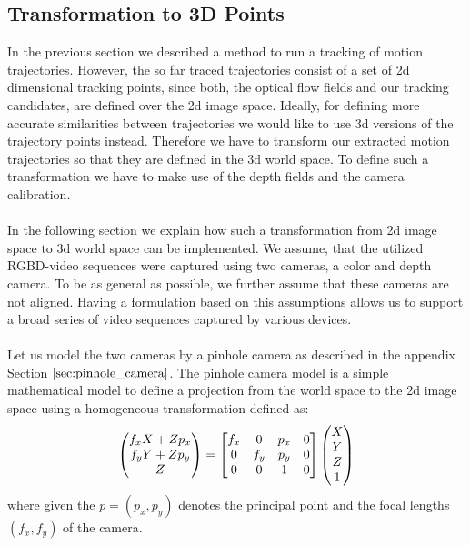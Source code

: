 \subsection{Transformation to 3D Points}
\label{subsection:transform_to_3d_points}
In the previous section we described a method to run a tracking of motion trajectories. However, the so far traced trajectories consist of a set of 2d dimensional tracking points, since both, the optical flow fields and our tracking candidates, are defined over the 2d image space. Ideally, for defining more accurate similarities between trajectories we would like to use 3d versions of the trajectory points instead. Therefore we have to transform our extracted motion trajectories so that they are defined in the 3d world space. To define such a transformation we have to make use of the depth fields and the camera calibration. \\ \\
In the following section we explain how such a transformation from 2d image space to 3d world space can be implemented. We assume, that the utilized RGBD-video sequences were captured using two cameras, a color and depth camera. To be as general as possible, we further assume that these cameras are not aligned. Having a formulation based on this assumptions allows us to support a broad series of video sequences captured by various devices. \\ \\
Let us model the two cameras by a pinhole camera as described in the appendix Section $\ref{sec:pinhole_camera}$. The pinhole camera model is a simple mathematical model to define a projection from the world space to the 2d image space using a homogeneous transformation defined as: 
\begin{equation}
\colvec[f_x X + Z p_x]{f_y Y + Z p_y}{Z} =
\begin{bmatrix}
f_x & 0 & p_x & 0 \\
0 & f_y & p_y & 0 \\
0 & 0 & 1 & 0
\end{bmatrix}
\begin{pmatrix}
X \\
Y \\
Z \\
1
\end{pmatrix}
\label{eq:homogen_camera_mat_transf}
\end{equation}
where given the  $p = \left(p_x, p_y \right)$ denotes the principal point and the focal lengths $\left(f_x, f_y \right)$ of the camera. \\ \\
